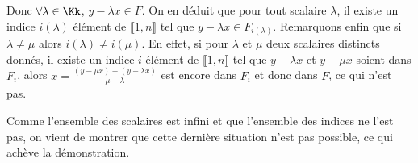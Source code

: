 {{Donc $\forall\lambda\in\Kk$, $y-\lambda x\in F$. On en déduit que pour tout scalaire $\lambda$, il existe un indice $i(\lambda)$ élément de $\llbracket1,n\rrbracket$ tel que $y-\lambda x\in F_{i(\lambda)}$. Remarquons enfin que si $\lambda\neq\mu$ alors $i(\lambda)\neq i(\mu)$. En effet, si pour $\lambda$ et $\mu$ deux scalaires distincts donnés, il existe un indice $i$ élément de $\llbracket1,n\rrbracket$ tel que $y-\lambda x$ et $y-\mu x$ soient dans $F_i$, alors $x=\frac{(y-\mu x)-(y-\lambda x)}{\mu-\lambda}$  est encore dans $F_i$ et donc dans $F$, ce qui n'est pas. 

Comme l'ensemble des scalaires est infini et que l'ensemble des indices ne l'est pas, on vient de montrer que cette dernière situation n'est pas possible, ce qui achève la démonstration.
}
}
